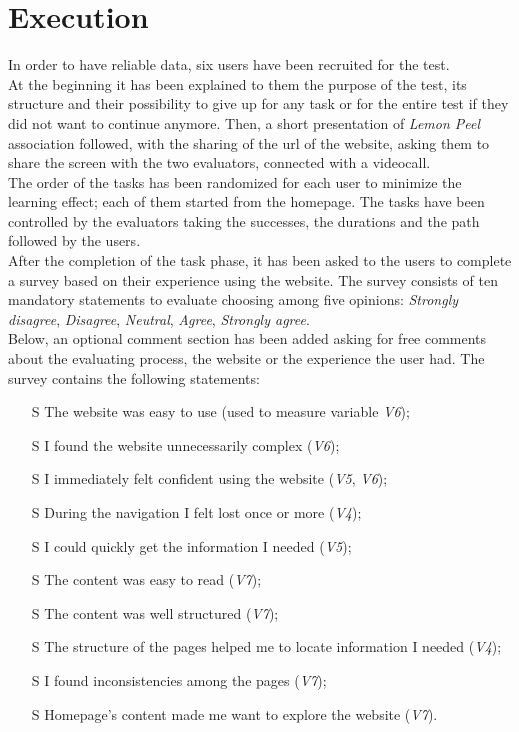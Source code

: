 \documentclass[../../UsabilityReport.tex]{subfiles}
\begin{document}
\section{Execution}\label{Execution-paragraph}
	In order to have reliable data, six users have been recruited for the test.\\
	At the beginning it has been explained to them the purpose of the test, its structure and their possibility to give up for any task or for the entire test if they did not want to continue anymore. Then, a short presentation of \textit{Lemon Peel} association followed, with the sharing of the url of the website, asking them to share the screen with the two evaluators, connected with a videocall.\\
	The order of the tasks has been randomized for each user to minimize the learning effect; each of them started from the homepage. The tasks have been controlled by the evaluators taking the successes, the durations and the path followed by the users.\\
	After the completion of the task phase, it has been asked to the users to complete a survey based on their experience using the website. The survey consists of ten mandatory statements to evaluate choosing among five opinions: \textit{Strongly disagree}, \textit{Disagree}, \textit{Neutral}, \textit{Agree}, \textit{Strongly agree}.\\
	Below, an optional comment section has been added asking for free comments about the evaluating process, the website or the experience the user had.
	The survey contains the following statements:
	\begin{itemize}
		\item[S\subs{1}] The website was easy to use (used to measure variable \textit{V6});
		\item[S\subs{2}] I found the website unnecessarily complex (\textit{V6});
		\item[S\subs{3}] I immediately felt confident using the website (\textit{V5}, \textit{V6});
		\item[S\subs{4}] During the navigation I felt lost once or more (\textit{V4});
		\item[S\subs{5}] I could quickly get the information I needed (\textit{V5});
		\item[S\subs{6}] The content was easy to read (\textit{V7});
		\item[S\subs{7}] The content was well structured (\textit{V7});
		\item[S\subs{8}] The structure of the pages helped me to locate information I needed (\textit{V4});
		\item[S\subs{9}] I found inconsistencies among the pages (\textit{V7});
		\item[S\subs{10}] Homepage’s content made me want to explore the website (\textit{V7}).
	\end{itemize}
\end{document}
